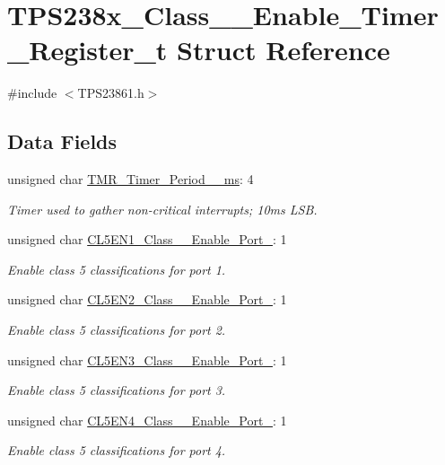 \hypertarget{struct_t_p_s238x___class__5___enable___timer___register__t}{\section{T\-P\-S238x\-\_\-\-Class\-\_\-\_\-\-Enable\-\_\-\-Timer\-\_\-\-Register\-\_\-t Struct Reference}
\label{struct_t_p_s238x___class__5___enable___timer___register__t}
}


{\ttfamily \#include $<$T\-P\-S23861.\-h$>$}

\subsection*{Data Fields}
\begin{DoxyCompactItemize}
\item 
unsigned char \hyperlink{struct_t_p_s238x___class__5___enable___timer___register__t_a8a42f6eb2d98cf7325c3814242b3a984}{T\-M\-R\-\_\-\-Timer\-\_\-\-Period\-\_\-\_\-ms}\-: 4
\begin{DoxyCompactList}\small\item\em Timer used to gather non-\/critical interrupts; 10ms L\-S\-B. \end{DoxyCompactList}\item 
unsigned char \hyperlink{struct_t_p_s238x___class__5___enable___timer___register__t_adda0a59e6072df361b48a697607fa9a1}{C\-L5\-E\-N1\-\_\-\-Class\-\_\-\_\-\-Enable\-\_\-\-Port\-\_}\-: 1
\begin{DoxyCompactList}\small\item\em Enable class 5 classifications for port 1. \end{DoxyCompactList}\item 
unsigned char \hyperlink{struct_t_p_s238x___class__5___enable___timer___register__t_a54608dd3e8e3780fbc3ae3050ec9ef02}{C\-L5\-E\-N2\-\_\-\-Class\-\_\-\_\-\-Enable\-\_\-\-Port\-\_}\-: 1
\begin{DoxyCompactList}\small\item\em Enable class 5 classifications for port 2. \end{DoxyCompactList}\item 
unsigned char \hyperlink{struct_t_p_s238x___class__5___enable___timer___register__t_ae31416f8a5eebf1e654054340dc521a5}{C\-L5\-E\-N3\-\_\-\-Class\-\_\-\_\-\-Enable\-\_\-\-Port\-\_}\-: 1
\begin{DoxyCompactList}\small\item\em Enable class 5 classifications for port 3. \end{DoxyCompactList}\item 
unsigned char \hyperlink{struct_t_p_s238x___class__5___enable___timer___register__t_a2307507a542fe542038cf803beddde85}{C\-L5\-E\-N4\-\_\-\-Class\-\_\-\_\-\-Enable\-\_\-\-Port\-\_}\-: 1
\begin{DoxyCompactList}\small\item\em Enable class 5 classifications for port 4. \end{DoxyCompactList}\end{DoxyCompactItemize}


